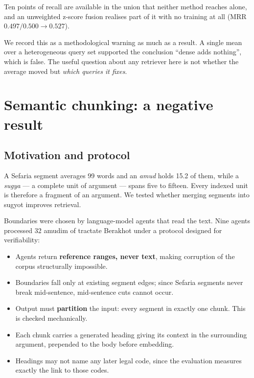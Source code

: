 \documentclass[11pt,a4paper]{article}
\begin{document}
Ten points of recall are available in the union that neither method reaches
alone, and an unweighted z-score fusion realises part of it with no training at
all (MRR $0.497/0.500 \to 0.527$).

We record this as a methodological warning as much as a result. A single mean
over a heterogeneous query set supported the conclusion ``dense adds nothing'',
which is false. The useful question about any retriever here is not whether the
average moved but \emph{which queries it fixes}.

\section{Semantic chunking: a negative result}\label{sec:chunking}

\subsection{Motivation and protocol}

A Sefaria segment averages 99 words and an \emph{amud} holds 15.2 of them, while
a \emph{sugya} --- a complete unit of argument --- spans five to fifteen. Every
indexed unit is therefore a fragment of an argument. We tested whether merging
segments into sugyot improves retrieval.

Boundaries were chosen by language-model agents that read the text. Nine agents
processed 32 amudim of tractate Berakhot under a protocol designed for
verifiability:

\begin{itemize}[itemsep=2pt]
\item Agents return \textbf{reference ranges, never text}, making corruption of
      the corpus structurally impossible.
\item Boundaries fall only at existing segment edges; since Sefaria segments
      never break mid-sentence, mid-sentence cuts cannot occur.
\item Output must \textbf{partition} the input: every segment in exactly one
      chunk. This is checked mechanically.
\item Each chunk carries a generated heading giving its context in the
      surrounding argument, prepended to the body before embedding.
\item Headings may not name any later legal code, since the evaluation measures
      exactly the link to those codes.
\end{itemize}
\end{document}

